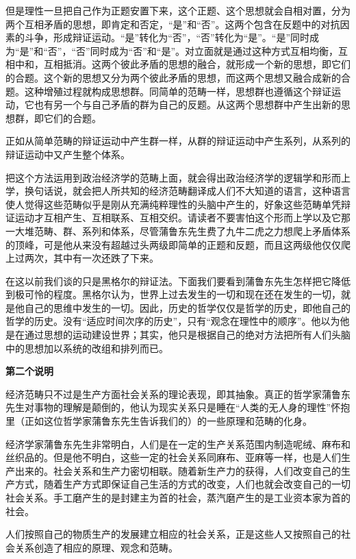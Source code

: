 \documentclass[a4paper,twoside,12pt,AutoFakeBold]{ctexart}
\begin{document}
但是理性一旦把自己作为正题安置下来，这个正题、这个思想就会自相对置，分为两个互相矛盾的思想，即肯定和否定，“是”和“否”。这两个包含在反题中的对抗因素的斗争，形成辩证运动。“是”转化为“否”，“否”转化为“是”。“是”同时成为“是”和“否”，“否”同时成为“否”和“是”。对立面就是通过这种方式互相均衡，互相中和，互相抵消。这两个彼此矛盾的思想的融合，就形成一个新的思想，即它们的合题。这个新的思想又分为两个彼此矛盾的思想，而这两个思想又融合成新的合题。这种增殖过程就构成思想群。同简单的范畴一样，思想群也遵循这个辩证运动，它也有另一个与自己矛盾的群为自己的反题。从这两个思想群中产生出新的思想群，即它们的合题。

正如从简单范畴的辩证运动中产生群一样，从群的辩证运动中产生系列，从系列的辩证运动中又产生整个体系。

把这个方法运用到政治经济学的范畴上面，就会得出政治经济学的逻辑学和形而上学，换句话说，就会把人所共知的经济范畴翻译成人们不大知道的语言，这种语言使人觉得这些范畴似乎是刚从充满纯粹理性的头脑中产生的，好象这些范畴单凭辩证运动才互相产生、互相联系、互相交织。请读者不要害怕这个形而上学以及它那一大堆范畴、群、系列和体系，尽管蒲鲁东先生费了九牛二虎之力想爬上矛盾体系的顶峰，可是他从来没有超越过头两级即简单的正题和反题，而且这两级他仅仅爬上过两次，其中有一次还跌了下来。

在这以前我们谈的只是黑格尔的辩证法。下面我们要看到蒲鲁东先生怎样把它降低到极可怜的程度。黑格尔认为，世界上过去发生的一切和现在还在发生的一切，就是他自己的思维中发生的一切。因此，历史的哲学仅仅是哲学的历史，即他自己的哲学的历史。没有“适应时间次序的历史”，只有“观念在理性中的顺序”。他以为他是在通过思想的运动建设世界；其实，他只是根据自己的绝对方法把所有人们头脑中的思想加以系统的改组和排列而已。

\begin{center}
    \textbf{第二个说明}
\end{center}

经济范畴只不过是生产方面社会关系的理论表现，即其抽象。真正的哲学家蒲鲁东先生对事物的理解是颠倒的，他认为现实关系只是睡在“人类的无人身的理性”怀抱里（正如这位哲学家蒲鲁东先生告诉我们的）的一些原理和范畴的化身。

经济学家蒲鲁东先生非常明白，人们是在一定的生产关系范围内制造呢绒、麻布和丝织品的。但是他不明白，这些一定的社会关系同麻布、亚麻等一样，也是人们生产出来的。社会关系和生产力密切相联。随着新生产力的获得，人们改变自己的生产方式，随着生产方式即保证自己生活的方式的改变，人们也就会改变自己的一切社会关系。手工磨产生的是封建主为首的社会，蒸汽磨产生的是工业资本家为首的社会。

人们按照自己的物质生产的发展建立相应的社会关系，正是这些人又按照自己的社会关系创造了相应的原理、观念和范畴。
\end{document}
